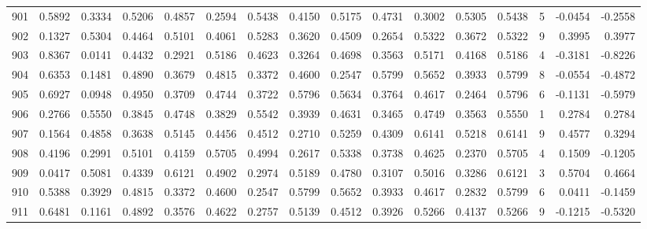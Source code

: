 \begin{tabular}{lrrrrrrrrrrrrrrr}
901 &      0.5892 &  0.3334 &  0.5206 &  0.4857 &  0.2594 &  0.5438 &  0.4150 &  0.5175 &  0.4731 &  0.3002 &   0.5305 &     0.5438 &      5 &                   -0.0454 &                    -0.2558 \\
902 &      0.1327 &  0.5304 &  0.4464 &  0.5101 &  0.4061 &  0.5283 &  0.3620 &  0.4509 &  0.2654 &  0.5322 &   0.3672 &     0.5322 &      9 &                    0.3995 &                     0.3977 \\
903 &      0.8367 &  0.0141 &  0.4432 &  0.2921 &  0.5186 &  0.4623 &  0.3264 &  0.4698 &  0.3563 &  0.5171 &   0.4168 &     0.5186 &      4 &                   -0.3181 &                    -0.8226 \\
904 &      0.6353 &  0.1481 &  0.4890 &  0.3679 &  0.4815 &  0.3372 &  0.4600 &  0.2547 &  0.5799 &  0.5652 &   0.3933 &     0.5799 &      8 &                   -0.0554 &                    -0.4872 \\
905 &      0.6927 &  0.0948 &  0.4950 &  0.3709 &  0.4744 &  0.3722 &  0.5796 &  0.5634 &  0.3764 &  0.4617 &   0.2464 &     0.5796 &      6 &                   -0.1131 &                    -0.5979 \\
906 &      0.2766 &  0.5550 &  0.3845 &  0.4748 &  0.3829 &  0.5542 &  0.3939 &  0.4631 &  0.3465 &  0.4749 &   0.3563 &     0.5550 &      1 &                    0.2784 &                     0.2784 \\
907 &      0.1564 &  0.4858 &  0.3638 &  0.5145 &  0.4456 &  0.4512 &  0.2710 &  0.5259 &  0.4309 &  0.6141 &   0.5218 &     0.6141 &      9 &                    0.4577 &                     0.3294 \\
908 &      0.4196 &  0.2991 &  0.5101 &  0.4159 &  0.5705 &  0.4994 &  0.2617 &  0.5338 &  0.3738 &  0.4625 &   0.2370 &     0.5705 &      4 &                    0.1509 &                    -0.1205 \\
909 &      0.0417 &  0.5081 &  0.4339 &  0.6121 &  0.4902 &  0.2974 &  0.5189 &  0.4780 &  0.3107 &  0.5016 &   0.3286 &     0.6121 &      3 &                    0.5704 &                     0.4664 \\
910 &      0.5388 &  0.3929 &  0.4815 &  0.3372 &  0.4600 &  0.2547 &  0.5799 &  0.5652 &  0.3933 &  0.4617 &   0.2832 &     0.5799 &      6 &                    0.0411 &                    -0.1459 \\
911 &      0.6481 &  0.1161 &  0.4892 &  0.3576 &  0.4622 &  0.2757 &  0.5139 &  0.4512 &  0.3926 &  0.5266 &   0.4137 &     0.5266 &      9 &                   -0.1215 &                    -0.5320 \\

\end{tabular}
